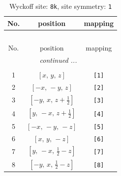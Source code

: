 \documentclass[fleqn,8pt]{jsarticle}
\begin{document}
\renewcommand{\arraystretch}{1.2}
\begin{longtable}{ccc}
\caption{Wyckoff site: {\tt 8k}, site symmetry: {\tt 1}}
 \\
 \hline \hline
No. & position & mapping \\ \hline \endfirsthead

\multicolumn{2}{l}{\tablename\ \thetable{}} \\
 \hline \hline
No. & position & mapping \\ \hline \endhead

 \hline \hline
\multicolumn{2}{r}{\footnotesize\it continued ...} \\ \endfoot

 \hline \hline
\multicolumn{2}{r}{} \\ \endlastfoot

1 & $\left[ x,\, y,\, z \right]$ & {\tt [1]} \\ \hline
2 & $\left[ - x,\, - y,\, z \right]$ & {\tt [2]} \\ \hline
3 & $\left[ - y,\, x,\, z + \frac{1}{2} \right]$ & {\tt [3]} \\ \hline
4 & $\left[ y,\, - x,\, z + \frac{1}{2} \right]$ & {\tt [4]} \\ \hline
5 & $\left[ - x,\, - y,\, - z \right]$ & {\tt [5]} \\ \hline
6 & $\left[ x,\, y,\, - z \right]$ & {\tt [6]} \\ \hline
7 & $\left[ y,\, - x,\, \frac{1}{2} - z \right]$ & {\tt [7]} \\ \hline
8 & $\left[ - y,\, x,\, \frac{1}{2} - z \right]$ & {\tt [8]} \\
\end{longtable}
\end{document}

